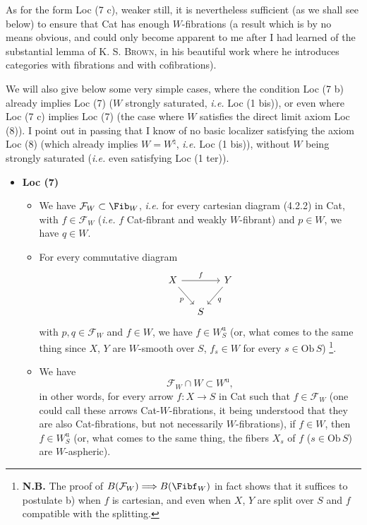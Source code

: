 As for the form Loc (7 c), weaker still, it is nevertheless sufficient (as we shall see below) to ensure that Cat has enough $W$-fibrations  (a result which is by no means obvious, and could only become apparent to me after I had learned of the substantial lemma of K. S. \textsc{Brown}, in his beautiful work where he introduces categories with fibrations and with cofibrations).

We will also give below some very simple cases, where the condition Loc (7 b) already implies Loc (7) ($W$ strongly saturated, \textit{i.e.} Loc (1 bis)), or even where Loc (7 c) implies Loc (7) (the case where $W$ satisfies the direct limit axiom Loc (8)). I point out in passing that I know of no basic localizer satisfying the axiom Loc (8) (which already implies $W = W^{\natural}$, \textit{i.e.} Loc (1 bis)), without $W$ being strongly saturated (\textit{i.e.} even satisfying Loc (1 ter)).

\begin{itemize}[label={},leftmargin=0.6cm]
\item \textbf{Loc (7)}
\begin{itemize}[leftmargin=1.2cm]
\item[a)] We have $\mathcal{F}_W \subset \Fib_W$, \textit{i.e.} for every cartesian diagram (4.2.2) in Cat, with $f \in \mathcal{F}_W$ (\textit{i.e.} $f$ Cat-fibrant and weakly $W$-fibrant) and $p \in W$, we have $q \in W$.
\item[b)] For every commutative diagram
\[
\begin{tikzcd}[column sep=small]
X \arrow[rr, "f"] \arrow[dr, "p"'] & & Y \arrow[dl, "q"] \\
 & S &
\end{tikzcd}
\]
with $p, q \in \mathcal{F}_W$ and $f \in W$, we have $f \in W_S^{\mathrm{u}}$ (or, what comes to the same thing since $X$, $Y$ are $W$-smooth over $S$, $f_s \in W$ for every $s \in \mathrm{Ob}\, S$) \footnote[25]{\textbf{N.B.} The proof of $B(\mathcal{F}_W) \Longrightarrow B(\Fibf_W)$ in fact shows that it suffices to postulate b) when $f$ is cartesian, and even when $X$, $Y$ are split over $S$ and $f$ compatible with the splitting.}.
\item[c)] We have
\[
\mathcal{F}_W \cap W \subset W^{\mathrm{u}},
\]
in other words, for every arrow $f : X \longrightarrow S$ in Cat such that $f \in \mathcal{F}_W$ (one could call these arrows Cat-$W$-fibrations, it being understood that they are also Cat-fibrations, but not necessarily $W$-fibrations), if $f \in W$, then $f \in W_S^{\mathrm{u}}$ (or, what comes to the same thing, the fibers $X_s$ of $f$ ($s \in \mathrm{Ob}\, S$) are $W$-aspheric).
\end{itemize}
\end{itemize}
